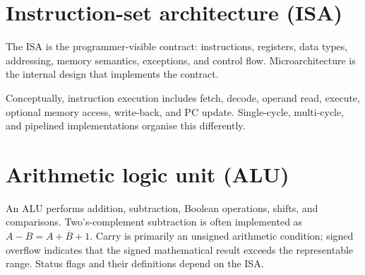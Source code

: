 \documentclass[11pt,a4paper]{article}
\begin{document}
\section{Instruction-set architecture (ISA)}
The ISA is the programmer-visible contract: instructions, registers, data types, addressing, memory semantics, exceptions, and control flow. Microarchitecture is the internal design that implements the contract.
\begin{center}\end{center}
Conceptually, instruction execution includes fetch, decode, operand read, execute, optional memory access, write-back, and PC update. Single-cycle, multi-cycle, and pipelined implementations organise this differently.
\section{Arithmetic logic unit (ALU)}
An ALU performs addition, subtraction, Boolean operations, shifts, and comparisons. Two's-complement subtraction is often implemented as $A-B=A+\overline{B}+1$. Carry is primarily an unsigned arithmetic condition; signed overflow indicates that the signed mathematical result exceeds the representable range. Status flags and their definitions depend on the ISA.
\begin{center}\end{center}
\end{document}
